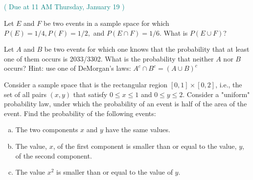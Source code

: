 \documentclass[12pt]{article}
\newenvironment{question}[2][Question]{\begin{trivlist}
\item[\hskip \labelsep {\bfseries #1}\hskip \labelsep {\bfseries #2.}]}{\end{trivlist}}
\begin{document}
\subsection*{}
\centering\textcolor{teal}{( Due at 11 AM Thursday, January 19 )}
\vspace{5mm}


 \begin{question}{1} Let $E$ and $F$ be two events in a sample space for which $P(E) = 1/4, P(F) = 1/2,$ and $P(E \cap F) = 1/6$. What is $P(E \cup F)$? 
\end{question} 

\vspace{5mm}


 \begin{question}{2} Let $A$ and $B$ be two events for which one knows that the probability that at least one of them occurs is 2033/3302. What is the probability that neither $A$ nor $B$ occurs? Hint: use one of DeMorgan's  laws: $A^c \cap B^c = (A \cup B)^c$ 
\end{question} 


\vspace{5mm}

\begin{question}{3} Consider a sample space that is the rectangular region
$[0, 1] \times [0, 2]$, i.e., the set of all pairs $(x, y)$ that satisfy $0 \leq x \leq 1$ and $0 \leq y \leq 2$.
 Consider a "uniform" probability law, under which the probability of an event is half of the area of the event. 
 Find the probability of the following events:
 \begin{enumerate}[(a)]
 \item The two components $x$ and $y$ have the same values.
 \item The value, $x$, of the first component is smaller than or equal to the value, $y$, of the second component.
  \item The value $x^2$ is smaller than or equal to the value of $y$. 
 \end{enumerate}

\end{question} 

\pagebreak
\end{document}
